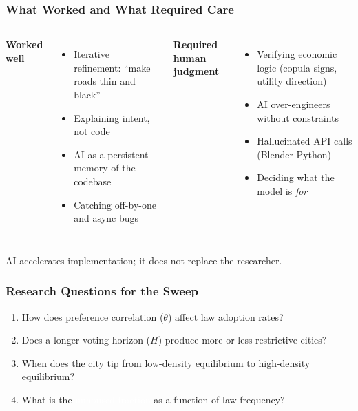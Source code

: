 \documentclass{beamer}
\begin{document}
\begin{frame}
  \frametitle{What Worked and What Required Care}
  \begin{columns}
    \textcolor{nimbygreen}{\textbf{Worked well}}
    \begin{itemize}
      \small
      \item Iterative refinement: ``make roads thin and black''
      \item Explaining intent, not code
      \item AI as a persistent memory of the codebase
      \item Catching off-by-one and async bugs
    \end{itemize}
    \textcolor{nimbyred}{\textbf{Required human judgment}}
    \begin{itemize}
      \small
      \item Verifying economic logic (copula signs, utility direction)
      \item AI over-engineers without constraints
      \item Hallucinated API calls (Blender Python)
      \item Deciding what the model is \emph{for}
    \end{itemize}
  \end{columns}
  \vspace{0.7em}
  \begin{center}
    \textcolor{nimbyyellow}{AI accelerates implementation; it does not replace the researcher.}
  \end{center}
\end{frame}


\begin{frame}
  \frametitle{Research Questions for the Sweep}
  \begin{enumerate}
    \item How does \textcolor{nimbyblue}{preference correlation} ($\theta$) affect law adoption rates?
    \item Does a \textcolor{nimbyyellow}{longer voting horizon} ($H$) produce more or less restrictive cities?
    \item When does the city tip from \textcolor{nimbygreen}{low-density equilibrium} to \textcolor{nimbyred}{high-density equilibrium}?
    \item What is the \textcolor{white}{unhoused fraction} as a function of law frequency?
  \end{enumerate}
\end{frame}
\end{document}
